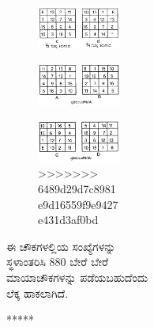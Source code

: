 \begin{figure}[H]
\begin{figure}[H]
\begin{figure}[H]
\begin{figure}[H]
\begin{figure}[H]
\includegraphics[scale=.75]{src/figures/chap4/fig4.12.jpg}
\end{figure}
\begin{figure}[H]
\includegraphics[scale=.75]{src/figures/chap4/fig4.13.jpg}
\end{figure}
\begin{figure}[H]
\includegraphics[scale=.75]{src/figures/chap4/fig4.14.jpg}
>>>>>>> 6489d29d7c8981e9d16559f9e9427e431d3af0bd
\end{figure}

ಈ ಚೌಕಗಳಲ್ಲಿಯ ಸಂಖ್ಯೆಗಳನ್ನು ಸ್ಥಳಾಂತರಿಸಿ 880 ಬೇರೆ ಬೇರೆ ಮಾಯಾಚೌಕಗಳನ್ನು ಪಡೆಯಬಹುದೆಂದು ಲೆಕ್ಕ ಹಾಕಲಾಗಿದೆ.
\begin{center}
*****
\end{center}


\end{figure}
\end{figure}
\end{figure}
\end{figure}
